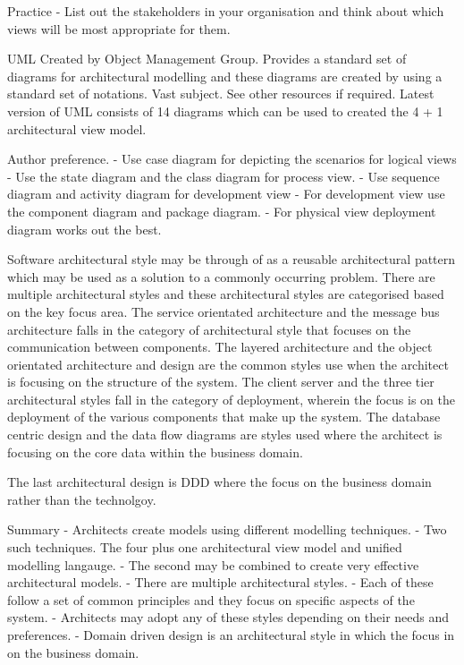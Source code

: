 Practice
- List out the stakeholders in your organisation and think about which views will be most appropriate for them.


UML
Created by Object Management Group.
Provides a standard set of diagrams for architectural modelling and these diagrams are created by using a standard set of notations.
Vast subject.
See other resources if required.
Latest version of UML consists of 14 diagrams which can be used to created the 4 + 1 architectural view model.

Author preference.
- Use case diagram for depicting the scenarios for logical views
- Use the state diagram and the class diagram for process view.
- Use sequence diagram and activity diagram for development view
- For development view use the component diagram and package diagram.
- For physical view deployment diagram works out the best.

Software architectural style may be through of as a reusable architectural pattern which may be used as a solution to a commonly occurring problem.
There are multiple architectural styles and these architectural styles are categorised based on the key focus area.
The service orientated architecture and the message bus architecture falls in the category of architectural style that focuses on the communication between components.
The layered architecture and the object orientated architecture and design are the common styles use when the architect is focusing on the structure of the system.
The client server and the three tier architectural styles fall in the category of deployment, wherein the focus is on the deployment of the various components that make up  the system.
The database centric design and the data flow diagrams are styles used where the architect is focusing on the core data within the business domain.


The last architectural design is DDD where the focus on the business domain rather than the technolgoy.

Summary
- Architects create models using different modelling techniques.
- Two such techniques.
The four plus one architectural view model and unified modelling langauge.
- The second may be combined to create very effective architectural models.
- There are multiple architectural styles.
- Each of these follow a set of common principles and they focus on specific aspects of the system.
- Architects may adopt any of these styles depending on their needs and preferences.
- Domain driven design is an architectural style in which the focus in on the business domain.

